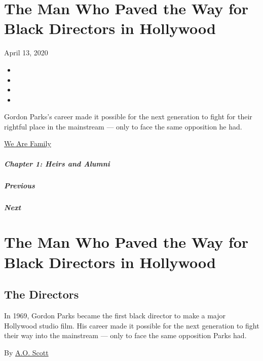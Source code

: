 \hypertarget{the-man-who-paved-the-way-for-black-directors-in-hollywood}{%
\section{The Man Who Paved the Way for Black Directors in
Hollywood}\label{the-man-who-paved-the-way-for-black-directors-in-hollywood}}

April 13, 2020

\begin{itemize}
\item
\item
\item
\item
\end{itemize}

Gordon Parks's career made it possible for the next generation to fight
for their rightful place in the mainstream --- only to face the same
opposition he had.

\href{https://www.nytimes3xbfgragh.onion/interactive/2020/04/13/t-magazine/culture-issue-2020.html}{We
Are Family}

\hypertarget{chapter-1-heirs-and-alumni}{%
\subparagraph{Chapter 1: Heirs and
Alumni}\label{chapter-1-heirs-and-alumni}}

\hypertarget{previous}{%
\subparagraph{Previous}\label{previous}}

\hypertarget{next}{%
\subparagraph{Next}\label{next}}

\hypertarget{the-man-who-paved-the-way-for-black-directors-in-hollywood-1}{%
\section{The Man Who Paved the Way for Black Directors in
Hollywood}\label{the-man-who-paved-the-way-for-black-directors-in-hollywood-1}}

\hypertarget{the-directors}{%
\subsection{The Directors}\label{the-directors}}

In 1969, Gordon Parks became the first black director to make a major
Hollywood studio film. His career made it possible for the next
generation to fight their way into the mainstream --- only to face the
same opposition Parks had.

By \href{https://www.nytimes3xbfgragh.onion/by/a-o--scott}{A.O. Scott}

